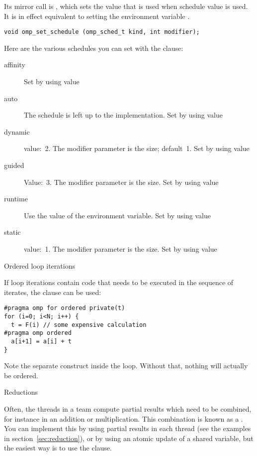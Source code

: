 Its mirror call is , which sets the
value that is used when schedule value  is used. It is in
effect equivalent to setting the environment variable
.
\begin{verbatim}
void omp_set_schedule (omp_sched_t kind, int modifier);
\end{verbatim}

Here are the various schedules you can set with the
 clause:
\begin{description}
  \item[affinity] Set by using value  
  \item[auto] The schedule is left up to the implementation. Set by
    using value 
  \item[dynamic] value:~2. The modifier parameter is the
     size; default~1. Set by using value
  \item[guided] Value:~3. The modifier parameter is the
     size. Set by using value
  \item[runtime] Use the value of the 
    environment variable. Set by using value
  \item[static] value:~1. The modifier parameter is the  size. Set by using value  
\end{description}

 {Ordered loop iterations}

If loop iterations contain code that needs to be executed in the sequence of iterates,
the  clause can be used:
\begin{verbatim}
#pragma omp for ordered private(t)
for (i=0; i<N; i++) {
  t = F(i) // some expensive calculation
#pragma omp ordered
  a[i+1] = a[i] + t
}
\end{verbatim}
Note the separate  construct inside the loop. Without that, nothing
will actually be ordered.

 {Reductions}

Often, the threads in a team compute partial results which
need to be combined, for instance in an addition or multiplication.
This combination is known as a .
You can implement this by using partial results
in each thread (see the examples in section~\ref{sec:reduction}),
or by using an atomic update of a shared variable, but the easiest
way is to use the  clause.

